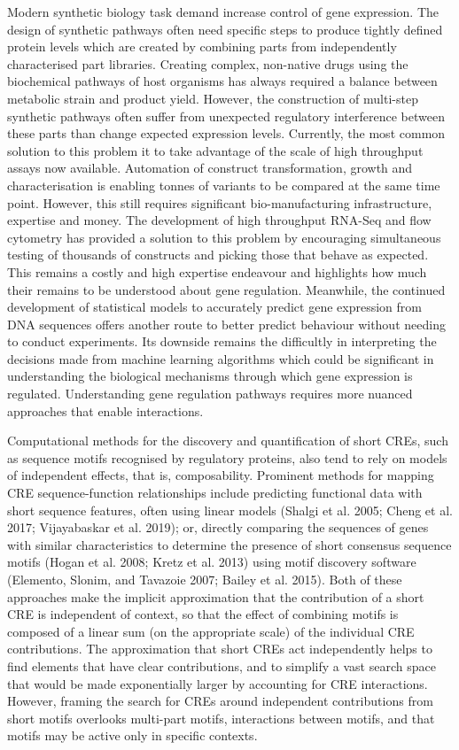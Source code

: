 \documentclass{SBCbookchapter}
\begin{document}
Modern synthetic biology task demand increase control of gene expression. The design of synthetic pathways often need specific steps to produce tightly defined protein levels which are created by combining parts from independently characterised part libraries. Creating complex, non-native drugs using the biochemical pathways of host organisms has always required a balance between metabolic strain and product yield. However, the construction of multi-step synthetic pathways often suffer from unexpected regulatory interference between these parts than change expected expression levels.  Currently, the most common solution to this problem it to take advantage of the scale of high throughput assays now available. Automation of construct transformation, growth and characterisation is enabling tonnes of variants to be compared at the same time point. However, this still requires significant bio-manufacturing infrastructure, expertise and money. The development of high throughput RNA-Seq and flow cytometry has provided a solution to this problem by encouraging simultaneous testing of thousands of constructs and picking those that behave as expected. This remains a costly and high expertise endeavour and highlights how much their remains to be understood about gene regulation. Meanwhile, the continued development of statistical models to accurately predict gene expression from DNA sequences offers another route to better predict behaviour without needing to conduct experiments. Its downside remains the difficultly in interpreting the decisions made from machine learning algorithms which could be significant in understanding the biological mechanisms through which gene expression is regulated. Understanding gene regulation pathways requires more nuanced approaches that enable interactions. 

Computational methods for the discovery and quantification of short CREs, such as sequence motifs recognised by regulatory proteins, also tend to rely on models of independent effects, that is, composability.
Prominent methods for mapping CRE sequence-function relationships include predicting functional data with short sequence features, often using linear models (Shalgi et al. 2005; Cheng et al. 2017; Vijayabaskar et al. 2019); or, directly comparing the sequences of genes with similar characteristics to determine the presence of short
consensus sequence motifs (Hogan et al. 2008; Kretz et al. 2013) using motif discovery software (Elemento, Slonim, and Tavazoie 2007; Bailey et al. 2015).
Both of these approaches make the implicit approximation that the contribution of a short CRE is independent of context, so that the effect of combining motifs is composed of a linear sum (on the appropriate scale) of the individual CRE contributions.
The approximation that short CREs act independently helps to find elements that have clear contributions, and to simplify a vast search space that would be made exponentially larger by accounting for CRE interactions. 
However, framing the search for CREs around independent contributions from short motifs overlooks multi-part motifs, interactions between motifs, and that motifs may be active only in specific contexts.
\end{document}
